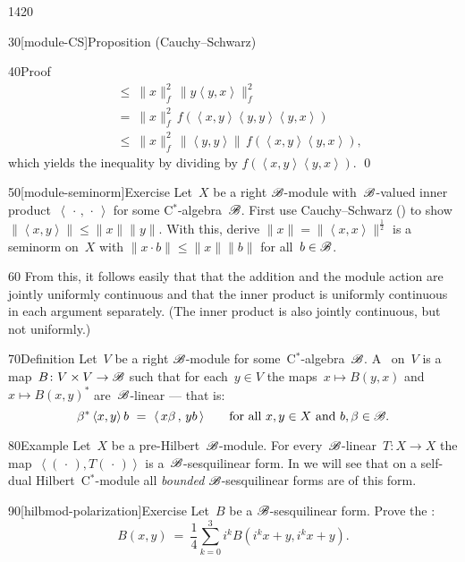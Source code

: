 \begin{parsec}{1420}
\begin{point}{30}[module-CS]{Proposition (Cauchy--Schwarz)}
\begin{point}{40}{Proof}
\begin{align*}
        &\  \leq\  \|x\|_f^2 \, \|y \left<y,x\right>\|_f^2 \\
    & \ =\  \|x\|_f^2\, f(\left<x,y\right>\left<y,y\right>\left<y,x\right>)\\
    & \ \leq\  \|x\|_f^2 \,
    \|\left<y,y\right>\| \,
    f(\left<x,y\right>\left<y,x\right>),
\end{align*}
    which yields the inequality by dividing by
$f(\left<x,y\right>\left<y,x\right>)$. \qed
\end{point}
\end{point}
\begin{point}{50}[module-seminorm]{Exercise}
Let~$X$ be a right $\mathscr{B}$-module
    with~$\mathscr{B}$-valued inner product~$\left<\,\cdot\,,\,\cdot\,\right>$
    for some C$^*$-algebra~$\mathscr{B}$.
First use Cauchy--Schwarz ()
    to show~$\|\left<x,y\right>\| \leq \|x\|\|y\|$.
With this, derive $\|x\| =\|\left<x,x\right>\|^{\frac{1}{2}}$ is a seminorm on~$X$ with
    $\|x \cdot b \| \leq \|x\|\|b\|$
    for all~$b \in \mathscr{B}$.
\begin{point}{60}%
From this, it follows easily that
that the addition and the module action
are jointly uniformly continuous
    and that the inner product is uniformly continuous in each argument
    separately.
(The inner product is also jointly continuous,
    but not uniformly.)
\end{point}
\end{point}
\begin{point}{70}{Definition}%
Let~$V$ be a right $\mathscr{B}$-module for some~C$^*$-algebra~$\mathscr{B}$.
A~ on~$V$
    is a map~$B\colon V\times V \to \mathscr{B}$
    such that for each~$y\in V$
    the maps~$x \mapsto B(y, x)$
        and~$x \mapsto B(x,y)^*$ are~$\mathscr{B}$-linear --- that is:
\begin{equation*}
\beta^* \,\langle x,y\rangle \,b \ =\ \langle \,x \beta\,,\, y b \,\rangle 
    \qquad \text{for all $x,y \in X$ and~$b,\beta \in \mathscr{B}$}.
\end{equation*}
\end{point}
\begin{point}{80}{Example}%
Let~$X$ be a pre-Hilbert~$\mathscr{B}$-module.
For every~$\mathscr{B}$-linear~$T\colon X \to X$
    the map~$\left<(\,\cdot\,), T (\,\cdot\,)\right>$
    is a~$\mathscr{B}$-sesquilinear form.
In 
    we will see that on a self-dual Hilbert~C$^*$-module
    all \emph{bounded}
    $\mathscr{B}$-sesquilinear forms
    are of this form.
\end{point}
\begin{point}{90}[hilbmod-polarization]{Exercise}%
Let~$B$ be a $\mathscr{B}$-sesquilinear form.
Prove the :
\begin{equation*}
    B(x,y) \ =\  \frac{1}{4} \sum_{k=0}^3 i^k B(i^k x + y, i^k x + y).
\end{equation*}
\end{point}
\end{parsec}

